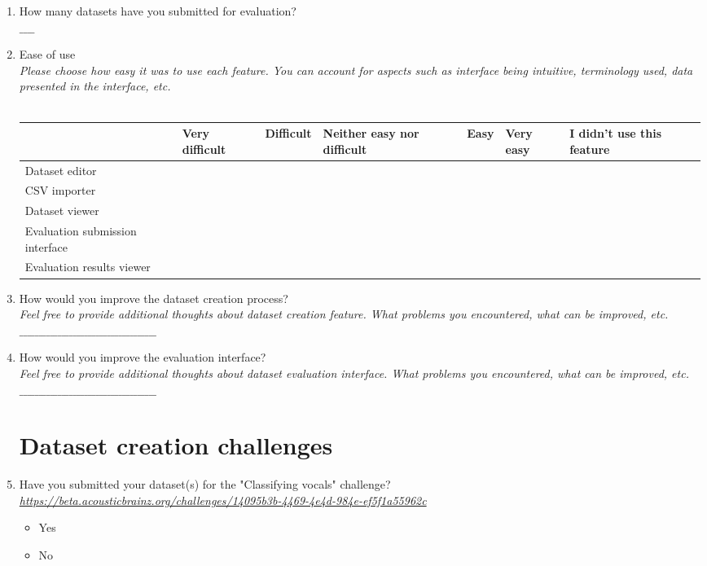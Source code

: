 \begin{enumerate}
    \item How many datasets have you submitted for evaluation? \\
    $\_\_\_\_$

    \item Ease of use \\
    \textit{Please choose how easy it was to use each feature. You can account for aspects such as interface being intuitive, terminology used, data presented in the interface, etc.} \\
    \\
    {\footnotesize
    \begin{tabularx}{\textwidth}{ X | X | l | X | l | l | X }
        & Very difficult & Difficult & Neither easy nor difficult & Easy & Very easy & I didn't use this feature \\
        \hline Dataset editor & & & & & & \\
        \hline CSV importer & & & & & & \\
        \hline Dataset viewer & & & & & & \\
        \hline Evaluation submission interface & & & & & & \\
        \hline Evaluation results viewer & & & & & & \\
    \end{tabularx}
    }

    \item How would you improve the dataset creation process? \\
    \textit{Feel free to provide additional thoughts about dataset creation feature. What problems you encountered, what can be improved, etc.} \\
    $\_\_\_\_\_\_\_\_\_\_\_\_\_\_\_\_\_\_\_\_\_\_\_\_\_\_\_\_\_\_\_\_\_\_\_\_$

    \item How would you improve the evaluation interface? \\
    \textit{Feel free to provide additional thoughts about dataset evaluation interface. What problems you encountered, what can be improved, etc.} \\
    $\_\_\_\_\_\_\_\_\_\_\_\_\_\_\_\_\_\_\_\_\_\_\_\_\_\_\_\_\_\_\_\_\_\_\_\_$

    \section*{Dataset creation challenges}

    \item Have you submitted your dataset(s) for the "Classifying vocals" challenge? \\
    \textit{\url{https://beta.acousticbrainz.org/challenges/14095b3b-4469-4e4d-984e-ef5f1a55962c}} \\
    \begin{itemize}[label=$\circ$]
        \item Yes
        \item No
    \end{itemize}


\end{enumerate}
